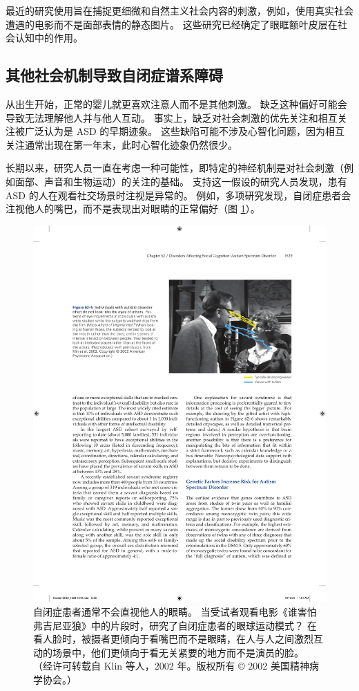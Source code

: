 最近的研究使用旨在捕捉更细微和自然主义社会内容的刺激，例如，使用真实社会遭遇的电影而不是面部表情的静态图片。
这些研究已经确定了眼眶额叶皮层在社会认知中的作用。



\subsection{其他社会机制导致自闭症谱系障碍}

从出生开始，正常的婴儿就更喜欢注意人而不是其他刺激。
缺乏这种偏好可能会导致无法理解他人并与他人互动。
事实上，缺乏对社会刺激的优先关注和相互关注被广泛认为是 ASD 的早期迹象。
这些缺陷可能不涉及心智化问题，因为相互关注通常出现在第一年末，此时心智化迹象仍然很少。


长期以来，研究人员一直在考虑一种可能性，即特定的神经机制是对社会刺激（例如面部、声音和生物运动）的关注的基础。
支持这一假设的研究人员发现，患有 ASD 的人在观看社交场景时注视是异常的。
例如，多项研究发现，自闭症患者会注视他人的嘴巴，而不是表现出对眼睛的正常偏好（图 \ref{fig:62_5}）。


\begin{figure}[htbp]
	\centering
	\includegraphics[width=0.65\linewidth]{chap62/fig_62_5}
	\caption{自闭症患者通常不会直视他人的眼睛。 当受试者观看电影《谁害怕弗吉尼亚狼》中的片段时，研究了自闭症患者的眼球运动模式？ 在看人脸时，被摄者更倾向于看嘴巴而不是眼睛，在人与人之间激烈互动的场景中，他们更倾向于看无关紧要的地方而不是演员的脸。 （经许可转载自 Klin 等人，2002 年。版权所有 © 2002 美国精神病学协会。）}
	\label{fig:62_5}
\end{figure}



